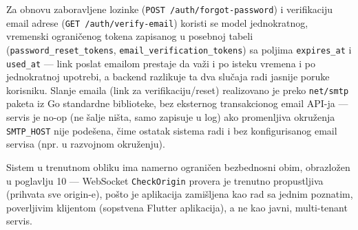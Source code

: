 Za obnovu zaboravljene lozinke (\texttt{POST /auth/forgot-password}) i verifikaciju email adrese (\texttt{GET /auth/verify-email}) koristi se model jednokratnog, vremenski ograničenog tokena zapisanog u posebnoj tabeli (\texttt{password\_reset\_tokens}, \texttt{email\_verification\_tokens}) sa poljima \texttt{expires\_at} i \texttt{used\_at} — link poslat emailom prestaje da važi i po isteku vremena i po jednokratnoj upotrebi, a backend razlikuje ta dva slučaja radi jasnije poruke korisniku. Slanje emaila (link za verifikaciju/reset) realizovano je preko \texttt{net/smtp} paketa iz Go standardne biblioteke, bez eksternog transakcionog email API-ja — servis je no-op (ne šalje ništa, samo zapisuje u log) ako promenljiva okruženja \texttt{SMTP\_HOST} nije podešena, čime ostatak sistema radi i bez konfigurisanog email servisa (npr. u razvojnom okruženju).

Sistem u trenutnom obliku ima namerno ograničen bezbednosni obim, obrazložen u poglavlju 10 — WebSocket \texttt{CheckOrigin} provera je trenutno propustljiva (prihvata sve origin-e), pošto je aplikacija zamišljena kao rad sa jednim poznatim, poverljivim klijentom (sopstvena Flutter aplikacija), a ne kao javni, multi-tenant servis.

\clearpage
